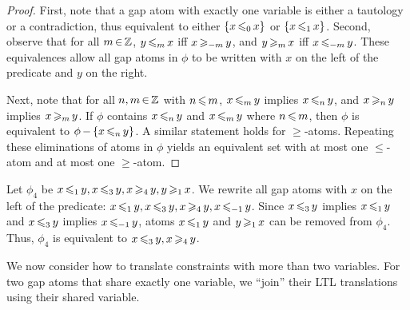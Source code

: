 \begin{proof}
First, note that a gap atom with exactly one variable
is either a tautology or a contradiction,
thus equivalent to either $\{x \,{\leqslant_0}\,x\}$
or $\{x \,{\leqslant_1}\,x\}$.
Second, observe that for all $m\,{\in}\,\mathbb{Z}$,
$y \,{\leqslant_m}\, x$ iff $x \,{\geqslant_{-m}}\, y$, and
$y \,{\geqslant_m}\, x$ iff $x \,{\leqslant_{-m}}\, y$.
These equivalences allow all gap atoms in $\phi$ to be written
with $x$ on the left of the predicate and $y$ on the right.

Next, note that for all $n,m\,{\in}\,\mathbb{Z}$ with $n\,{\leqslant}\, m$,
$x\,{\leqslant_m}\, y$ implies $x\,{\leqslant_n}\, y$, and
$x\,{\geqslant_n}\, y$ implies $x\,{\geqslant_m}\, y$.
If $\phi$ contains $x\,{\leqslant_n}\, y$ and
$x\,{\leqslant_m}\, y$ where $n\,{\leqslant}\, m$,
then $\phi$ is equivalent to $\phi\,{-}\,\{x\,{\leqslant_n}\, y\}$.
A similar statement holds for $\geq$-atoms.
Repeating these eliminations of atoms in $\phi$
yields an equivalent set
with at most one $\leq$-atom and at most one $\geq$-atom.
\end{proof}

\begin{examp}
Let $\phi_4$ be $x\,{\leqslant_1}\, y, x\,{\leqslant_3}\, y,
x\,{\geqslant_4}\, y, y\,{\geqslant_1}\, x$.
We rewrite all gap atoms with $x$ on the left of the predicate:
$x\,{\leqslant_1}\, y, x\,{\leqslant_3}\, y,
x\,{\geqslant_4}\, y, x\,{\leqslant_{-1}}\, y$.
Since $x\,{\leqslant_3}\, y$ implies $x\,{\leqslant_1}\, y$ 
and $x\,{\leqslant_3}\, y$ implies $x\,{\leqslant_{-1}}\, y$,
atoms $x\,{\leqslant_1}\, y$ and $y\,{\geqslant_{1}}\, x$
can be removed from $\phi_4$.
Thus, $\phi_4$ is equivalent to
$x\,{\leqslant_3}\, y, x\,{\geqslant_4}\, y$.
\end{examp}

We now consider how to translate constraints with more than two variables.
For two gap atoms that share exactly one variable,
we ``join'' their LTL translations
using their shared variable.

